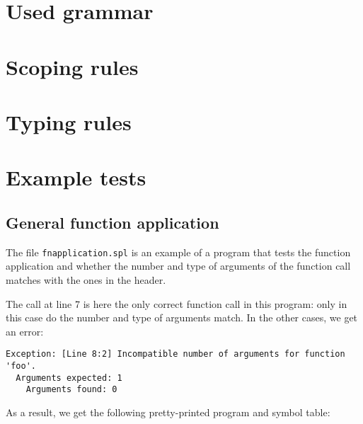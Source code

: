 \documentclass[a4paper]{article}
\begin{document}
\newpage %
\section{Used grammar}


\newpage %
\section{Scoping rules}


\newpage %
\section{Typing rules}

\newpage %
\section{Example tests}
\label{examples}

\subsection{General function application}
The file {\tt fnapplication.spl} is an example of a program that tests the function application and whether the number and type of arguments of the function call matches with the ones in the header.

The call at line 7 is here the only correct function call in this program: only in this case do the number and type of arguments match. In the other cases, we get an error: 

\begin{verbatim}
Exception: [Line 8:2] Incompatible number of arguments for function 'foo'.
  Arguments expected: 1
    Arguments found: 0
\end{verbatim}

As a result, we get the following pretty-printed program and symbol table: 
\end{document}
